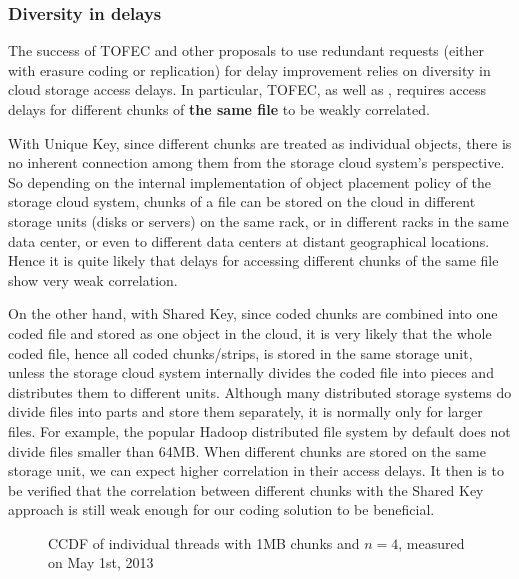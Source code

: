 \documentclass[journal]{IEEEtran}
\newcommand{\ourproposal}{TOFEC\xspace}
\newcommand{\threewidth}{0.3\textwidth}
\begin{document}
\subsubsection{Diversity in delays} The success of \ourproposal and other 
proposals to use redundant requests (either with erasure coding or replication) for delay improvement relies on diversity in cloud storage access delays. In particular, \ourproposal, as well as \cite{fastcloud,Longbocodeingincloud,MDS-queue}, requires access delays for different chunks of {\bf the same file} to be weakly correlated.
  
With Unique Key, since different chunks are treated as individual objects, there is no inherent connection among them from the storage cloud system's perspective. So depending on the internal implementation of object placement policy of the storage cloud system, chunks of a file can be stored on the cloud in different storage units (disks or servers) on the same rack, or in different racks in the same data center, or even to different data centers at distant geographical locations. Hence it is quite likely that delays for accessing different chunks of the same file show very weak correlation. 

On the other hand, with Shared Key, since coded chunks are combined into one coded file and stored as one object in the cloud, it is very likely that the whole coded file, hence all coded chunks/strips, is stored in the same storage unit, unless the storage cloud system internally divides the coded file into pieces and distributes them to different units. Although many distributed storage systems do divide files into parts and store them separately, it is normally only for larger files. For example, the popular Hadoop distributed file system by default does not divide files smaller than 64MB. When different chunks are stored on the same storage unit, we can expect higher correlation in their access delays. It then is to be verified that the correlation between different chunks with the Shared Key approach is still weak enough for our coding solution to be beneficial. 


\begin{figure*}[!t]
\centering
\hfill
\hfill
		\caption{CCDF of individual threads with 1MB chunks and $n=4$, measured on May 1st, 2013}
\label{fig:ccdf:thread}
\end{figure*}
\end{document}

